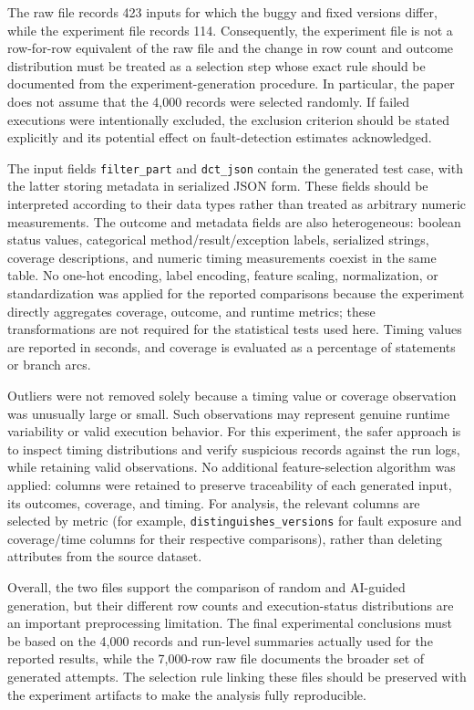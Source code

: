 \documentclass[12pt,onecolumn]{IEEEtran}
\begin{document}
The raw file records 423 inputs for which the buggy and fixed versions differ, while the experiment file records 114. Consequently, the experiment file is not a row-for-row equivalent of the raw file and the change in row count and outcome distribution must be treated as a selection step whose exact rule should be documented from the experiment-generation procedure. In particular, the paper does not assume that the 4,000 records were selected randomly. If failed executions were intentionally excluded, the exclusion criterion should be stated explicitly and its potential effect on fault-detection estimates acknowledged.

The input fields \texttt{filter\_part} and \texttt{dct\_json} contain the generated test case, with the latter storing metadata in serialized JSON form. These fields should be interpreted according to their data types rather than treated as arbitrary numeric measurements. The outcome and metadata fields are also heterogeneous: boolean status values, categorical method/result/exception labels, serialized strings, coverage descriptions, and numeric timing measurements coexist in the same table. No one-hot encoding, label encoding, feature scaling, normalization, or standardization was applied for the reported comparisons because the experiment directly aggregates coverage, outcome, and runtime metrics; these transformations are not required for the statistical tests used here. Timing values are reported in seconds, and coverage is evaluated as a percentage of statements or branch arcs.

Outliers were not removed solely because a timing value or coverage observation was unusually large or small. Such observations may represent genuine runtime variability or valid execution behavior. For this experiment, the safer approach is to inspect timing distributions and verify suspicious records against the run logs, while retaining valid observations. No additional feature-selection algorithm was applied: columns were retained to preserve traceability of each generated input, its outcomes, coverage, and timing. For analysis, the relevant columns are selected by metric (for example, \texttt{distinguishes\_versions} for fault exposure and coverage/time columns for their respective comparisons), rather than deleting attributes from the source dataset.

Overall, the two files support the comparison of random and AI-guided generation, but their different row counts and execution-status distributions are an important preprocessing limitation. The final experimental conclusions must be based on the 4,000 records and run-level summaries actually used for the reported results, while the 7,000-row raw file documents the broader set of generated attempts. The selection rule linking these files should be preserved with the experiment artifacts to make the analysis fully reproducible.
\end{document}

